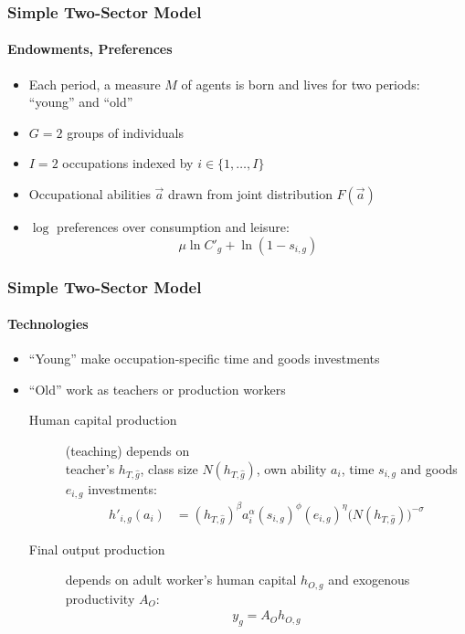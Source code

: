 \documentclass[11pt]{beamer}
\begin{document}
	\begin{frame}
		\frametitle{Simple Two-Sector Model}
		\framesubtitle{Endowments, Preferences}
		\begin{itemize}
			\item Each period, a measure $M$ of agents is born and lives for two periods: ``young'' and ``old''
			\item $G=2$ groups of individuals
            \item $I=2$ occupations indexed by $i \in \{1,\dots,I\}$
			\item Occupational abilities $\vec{a}$ drawn from joint distribution $F(\vec{a})$
			\item $\log$ preferences over consumption and leisure:
			\begin{displaymath}
				\mu \ln C'_{g} + \ln\left(1-s_{i,g} \right)
			\end{displaymath}
		\end{itemize}
	\end{frame}
	
	\begin{frame}
		\frametitle{Simple Two-Sector Model}
		\framesubtitle{Technologies}
		\begin{itemize}
			\item ``Young'' make occupation-specific time and goods investments
			\item ``Old'' work as \alert{teachers} or \alert{production workers}
			\begin{description}
				\item[Human capital production] (teaching) depends on\\
				teacher's $h_{T,\hat{g}}$, class size $N(h_{T,\hat{g}})$,  own ability $a_i$, time $s_{i,g}$ and goods $e_{i,g}$ investments:
				\begin{align*}
					\label{}
					h'_{i,g}(a_i) & =\left( h_{T,\hat{g}}\right)^\beta a_i^\alpha(s_{i,g})^{\phi} (e_{i,g})^{\eta}\big(N(h_{T,\hat{g}})\big)^{-\sigma}
				\end{align*}
				\item[Final output production] depends on adult worker's human capital $h_{O,g}$ and exogenous productivity $A_O$:
				\begin{align*}
					\label{}
					y_g = A_O h_{O,g}
				\end{align*}
			\end{description}
		\end{itemize}
	\end{frame}
\end{document}
